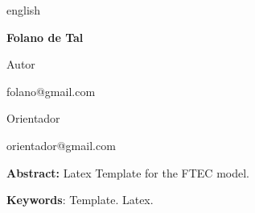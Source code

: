\begin{Spacing}{1.0}
    \begin{otherlanguage*}{english}

\begin{center}
    \ABNTEXchapterfont\bfseries\large\imprimirtitulo
\end{center}
\hfill

\hspace*{0pt}\hfill \bfseries\normalsize Folano de Tal

\hspace*{0pt}\hfill \normalfont Autor

\hspace*{0pt}\hfill \normalfont folano@gmail.com

\hfill

\hspace*{0pt}\hfill
{\bfseries\normalsize\imprimirorientador\par}

\hspace*{0pt}\hfill \normalfont\normalsize Orientador

\hspace*{0pt}\hfill \normalfont orientador@gmail.com

\hfill

\hfill

\begin{resumo}[]
    
\textbf{Abstract:}
Latex Template for the FTEC model.

\hfill

\textbf{Keywords}:
Template. Latex.
\end{resumo}
    \end{otherlanguage*}
\end{Spacing}\PRIVATEclearpageifneeded

  